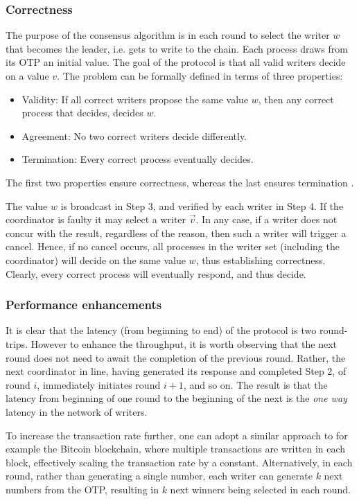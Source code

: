 \documentclass[10pt]{article}
\begin{document}
\subsubsection*{Correctness}

The purpose of the consensus algorithm is in each round to select the writer $w$ that becomes the leader, i.e. gets to write to the chain. Each process draws from its OTP an initial value. The goal of the protocol is that all valid writers decide on a value $v$. The problem can be formally defined in terms of three properties:
\begin{itemize}
    \item Validity: If all correct writers propose the same value $w$, then any correct process that decides, decides $w$.
    \item Agreement: No two correct writers decide differently.
    \item Termination: Every correct process eventually decides.
\end{itemize}

The first two properties ensure correctness, whereas the last ensures termination \cite{Alpern-Schneider}. 

The value $w$ is broadcast in Step 3, and verified by each writer in Step 4. If the coordinator is faulty it may select a writer $\vec{v}$. In any case, if a writer does not concur with the result, regardless of the reason, then such a writer will trigger a cancel. Hence, if no cancel occurs, all processes in the writer set (including the coordinator) will decide on the same value $w$, thus establishing correctness. Clearly, every correct process will eventually respond, and thus decide.



\subsubsection*{Performance enhancements}
It is clear that the latency (from beginning to end) of the protocol is two round-trips. However to enhance the throughput, it is worth observing that the next round does not need to await the completion of the previous round. Rather, the next coordinator in line, having generated its response and completed Step 2, of round $i$, immediately initiates round $i+1$, and so on. The result is that the latency from beginning of one round to the beginning of the next is the \emph{one way} latency in the network of writers.

To increase the transaction rate further, one can adopt a similar approach to for example the Bitcoin blockchain, where multiple transactions are written in each block, effectively scaling the transaction rate by a constant. Alternatively, in each round, rather than generating a single number, each writer can generate $k$ next numbers from the OTP, resulting in $k$ next winners being selected in each round.
\end{document}
